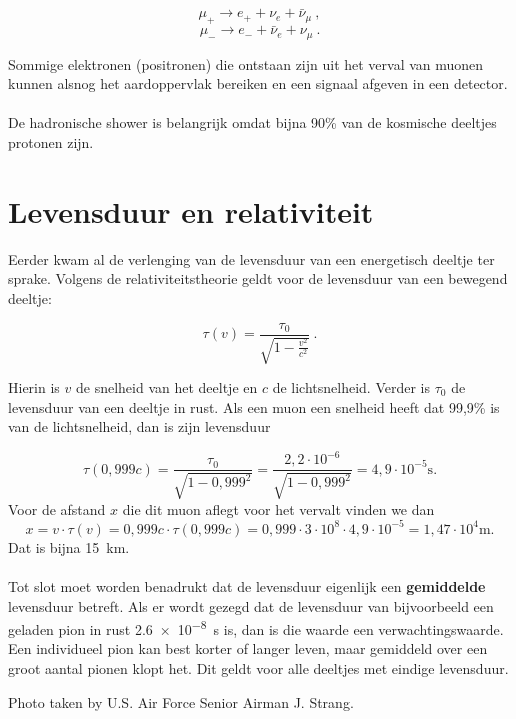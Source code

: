 \begin{equation}
\mu_{+} \rightarrow e_{+} + \nu_e + \bar{\nu}_\mu \ , \nonumber
\end{equation}
\begin{equation}
\mu_{-} \rightarrow e_{-} + \bar{\nu}_e + \nu_\mu \ . \nonumber
\end{equation}  

Sommige elektronen (positronen) die ontstaan zijn uit het verval van
muonen kunnen alsnog het aardoppervlak bereiken en een signaal afgeven
in een \hisparc detector.
\\ \\
De hadronische shower is belangrijk omdat bijna 90\% van de kosmische
deeltjes protonen zijn.
 

\section{Levensduur en relativiteit}

Eerder kwam al de verlenging van de levensduur van een energetisch
deeltje ter sprake. Volgens de relativiteitstheorie geldt voor de
levensduur van een bewegend deeltje:

\begin{equation}
\tau (v) = \frac{\tau_0}{\sqrt{1-\frac{v^2}{c^2}}} \ . \nonumber
\end{equation}

Hierin is $v$ de snelheid van het deeltje en $c$ de lichtsnelheid.
Verder is $\tau_0$ de levensduur van een deeltje in rust. Als een muon
een snelheid heeft dat 99,9\% is van de lichtsnelheid, dan is zijn
levensduur 

\begin{equation}
\tau(0,999c)=\frac{\tau_0}{\sqrt{1-0,999^2}}=\frac{2,2 \cdot 10^{-6}}{\sqrt{1-0,999^2}}=4,9 \cdot 10^{-5} \textrm{s}. \nonumber
\end{equation}
Voor de afstand $x$ die dit muon aflegt voor het vervalt vinden we dan 
\begin{equation}
x = v \cdot \tau (v)= 0,999c \cdot \tau (0,999c) = 0,999 \cdot 3 \cdot 10^8 \cdot 4,9 \cdot 10^{-5}=1,47 \cdot 10^4 \textrm{m}. \nonumber
\end{equation}
Dat is bijna \SI{15}{\km}. 
\\ \\

Tot slot moet worden benadrukt dat de levensduur eigenlijk een
\textbf{gemiddelde} levensduur betreft. Als er wordt gezegd dat de
levensduur van bijvoorbeeld een geladen pion in rust
\SI{2,6e-8}{\second} is, dan is die waarde een verwachtingswaarde. Een
individueel pion kan best korter of langer leven, maar gemiddeld over
een groot aantal pionen klopt het. Dit geldt voor alle deeltjes met
eindige levensduur.


\begin{thebibliography}{9}
     Photo taken by U.S. Air Force Senior Airman J. Strang.
\end{thebibliography}



